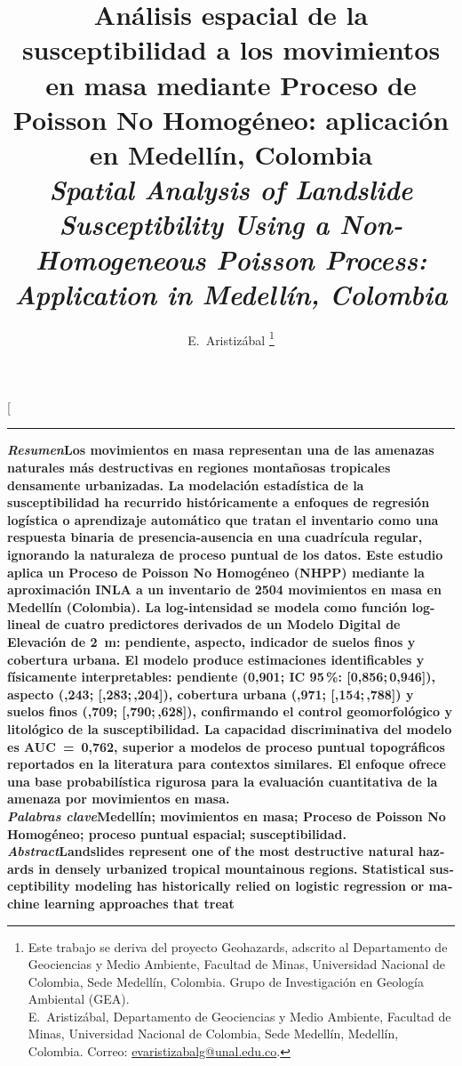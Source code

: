 \documentclass[10pt, twocolumn, letterpaper]{article}
\title{%
  {\fontsize{18}{22}\selectfont\textbf{%
    Análisis espacial de la susceptibilidad a los movimientos en masa
    mediante Proceso de Poisson No Homogéneo: aplicación en Medellín, Colombia}}%
  \\[6pt]%
  {\fontsize{18}{22}\selectfont\textbf{\textit{%
    Spatial Analysis of Landslide Susceptibility Using a Non-Homogeneous
    Poisson Process: Application in Medellín, Colombia}}}%
}
\author{%
  {\fontsize{11}{13}\selectfont E.~Aristizábal}%
  \thanks{\footnotesize
        Este trabajo se deriva del proyecto Geohazards, adscrito al
    Departamento de Geociencias y Medio Ambiente, Facultad de Minas,
    Universidad Nacional de Colombia, Sede Medellín, Colombia.
    Grupo de Investigación en Geología Ambiental (GEA).\\[2pt]
    \hspace*{12pt}E.~Aristizábal, Departamento de Geociencias y Medio Ambiente,
    Facultad de Minas, Universidad Nacional de Colombia, Sede Medellín,
    Medellín, Colombia. Correo:
    \href{mailto:evaristizabalg@unal.edu.co}{evaristizabalg@unal.edu.co}.}%
}
\date{}
\begin{document}
\twocolumn[{%
  \maketitle
  \vspace{-4pt}
  \noindent\rule{\linewidth}{0.4pt}\vspace{3pt}
  {\small\noindent
    \textbf{\textit{Resumen}}\textemdash\textbf{Los movimientos en masa
    representan una de las amenazas naturales más destructivas en regiones
    montañosas tropicales densamente urbanizadas. La modelación estadística
    de la susceptibilidad ha recurrido históricamente a enfoques de regresión
    logística o aprendizaje automático que tratan el inventario como una
    respuesta binaria de presencia-ausencia en una cuadrícula regular,
    ignorando la naturaleza de proceso puntual de los datos. Este estudio
    aplica un Proceso de Poisson No Homogéneo (NHPP) mediante la aproximación
    INLA a un inventario de \num{2504} movimientos en masa en Medellín
    (Colombia). La log-intensidad se modela como función log-lineal de cuatro
    predictores derivados de un Modelo Digital de Elevación de \SI{2}{m}:
    pendiente, aspecto, indicador de suelos finos y cobertura urbana. El
    modelo produce estimaciones identificables y físicamente interpretables:
    pendiente (0,901; IC 95\,\%: [0,856;\,0,946]),
    aspecto (,243; [,283;\,,204]),
    cobertura urbana (,971; [,154;\,,788]) y
    suelos finos (,709; [,790;\,,628]),
    confirmando el control geomorfológico y litológico de la susceptibilidad.
    La capacidad discriminativa del modelo es AUC~=~0,762, superior a modelos de
    proceso puntual topográficos reportados en la literatura para contextos similares.
    El enfoque ofrece una base probabilística rigurosa para la evaluación
    cuantitativa de la amenaza por movimientos en masa.}\\[3pt]
    \textbf{\textit{Palabras clave}}\textemdash\textbf{Medellín; movimientos
    en masa; Proceso de Poisson No Homogéneo; proceso puntual espacial;
    susceptibilidad.}\\[3pt]
    \foreignlanguage{english}{%
    \textbf{\textit{Abstract}}\textemdash\textbf{Landslides represent one of
    the most destructive natural hazards in densely urbanized tropical
    mountainous regions. Statistical susceptibility modeling has historically
    relied on logistic regression or machine learning approaches that treat
}}}}
\end{document}

